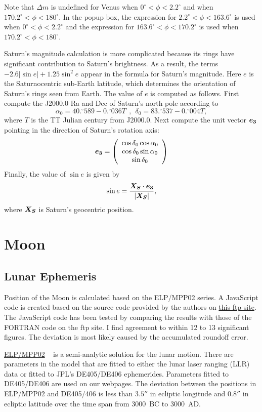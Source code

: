 \documentclass[12pt]{article}
\newcommand \beq {\begin{equation}}
\newcommand \eeq {\end{equation}}
\newcommand{\ve}[1]{\mbox{\boldmath $#1$}}
\begin{document}
Note that $\Delta m$ is undefined for Venus when $0^\circ < \phi < 2.2^\circ$ and 
when $170.2^\circ < \phi < 180^\circ$. In the popup box, the expression for 
$2.2^\circ < \phi < 163.6^\circ$ is used when $0^\circ < \phi < 2.2^\circ$ 
and the expression for $163.6^\circ < \phi < 170.2^\circ$ is used when 
$170.2^\circ < \phi < 180^\circ$.

Saturn's magnitude calculation is more complicated because its rings have 
significant contribution to Saturn's brightness. As a result, the terms 
$- 2.6 |\sin e| + 1.25\sin^2 e$ appear in the formula for Saturn's magnitude. 
Here $e$ is the Saturnocentric sub-Earth latitude, which determines the orientation 
of Saturn's rings seen from Earth. The value of $e$ is computed as follows.
First compute the J2000.0 Ra and Dec of Saturn's north pole according to 
\beq
  \alpha_0 = 40.^{\circ}589 - 0.^{\circ}036 T \ \ , \ \ 
  \delta_0 = 83.^{\circ}537 - 0.^{\circ}004 T ,
\eeq
where $T$ is the TT Julian century from J2000.0. Next compute the 
unit vector $\ve{e_3}$ pointing in the direction of Saturn's rotation axis:
\beq
\ve{e_3} = \left( \begin{array}{c} 
\cos \delta_0 \cos \alpha_0 \\ \cos \delta_0 \sin \alpha_0 \\ \sin \delta_0 
\end{array} \right) 
\label{eq:SaturnE3}
\eeq
Finally, the value of $\sin e$ is given by 
\beq
  \sin e = \frac{\ve{X_S}\cdot \ve{e_3}}{|\ve{X_S}|} ,
\eeq
where $\ve{X_S}$ is Saturn's geocentric position.

\section{Moon}

\subsection{Lunar Ephemeris}

Position of the Moon is calculated based on the ELP/MPP02 series. A JavaScript 
code is created based on the source code provided by the authors on 
\href{ftp://cyrano-se.obspm.fr/pub/2_lunar_solutions/2_elpmpp02/}{this ftp site}. 
The JavaScript code has been tested by comparing the results with those of the 
FORTRAN code on the ftp site. I find agreement to within 12 to 13 significant figures. 
The deviation is most likely caused by the accumulated roundoff error. 

\href{http://adsabs.harvard.edu/abs/2003A%26A...404..735C}{ELP/MPP02} \
is a semi-analytic solution for the lunar motion. There are 
parameters in the model that are fitted to either the lunar 
laser ranging (LLR) data or fitted to JPL's DE405/DE406 ephemerides. 
Parameters fitted to DE405/DE406 are used on our webpages. The deviation between 
the positions in ELP/MPP02 and DE405/406 is less than $3.5''$ in ecliptic longitude 
and $0.8''$ in ecliptic latitude over the time span from 3000~BC to 3000~AD. 
\end{document}

